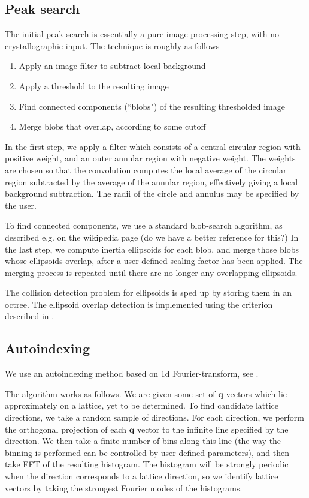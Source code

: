 \documentclass[twocolumn,preprintnumbers,amsmath,amssymb]{revtex4}
\newcommand{\bq}{\mathbf{q}}
\begin{document}
\subsection{Peak search} \label{peak-search}
The initial peak search is essentially a pure image processing step, with no crystallographic
input. The technique is roughly as follows
\begin{enumerate}
  \item Apply an image filter to subtract local background
  \item Apply a threshold to the resulting image
  \item Find connected components (``blobs") of the resulting thresholded image
  \item Merge blobs that overlap, according to some cutoff
\end{enumerate}

In the first step, we apply a filter which consists of a central circular region with positive weight,
and an outer annular region with negative weight. The weights are chosen so that the convolution
computes the local average of the circular region subtracted by the average of the annular region,
effectively giving a local background subtraction. The radii of the circle and annulus may be
specified by the user.

To find connected components, we use a standard blob-search algorithm, as described e.g. on the
wikipedia page (do we have a better reference for this?) In the last step, we compute inertia
ellipsoids for each blob, and merge those blobs whose ellipsoids overlap, after a user-defined
scaling factor has been applied. The merging process is repeated until there are no longer any
overlapping ellipsoids.

The collision detection problem for ellipsoids is sped up by storing them in an octree. The
ellipsoid overlap detection is implemented using the criterion described in \cite{ellipsoid-collision}.


\subsection{Autoindexing} \label{autoindex}
We use an autoindexing method based on 1d Fourier-transform, see \cite{StBR97,SaGA04}.

The algorithm works as follows. We are given some set of $\bq$ vectors which lie approximately on
a lattice, yet to be determined. To find candidate lattice directions, we take a random sample of
directions. For each direction, we perform the orthogonal projection of each $\bq$ vector to the
infinite line specified by the direction. We then take a finite number of bins along this line
(the way the binning is performed can be controlled by user-defined parameters), and then take
FFT of the resulting histogram. The histogram will be strongly periodic when the direction corresponds
to a lattice direction, so we identify lattice vectors by taking the strongest Fourier modes of
the histograms.
\end{document}
